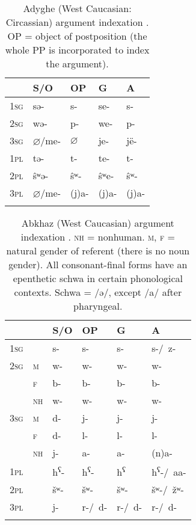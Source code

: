 \documentclass[output=paper,hidelinks]{langscibook}
\begin{document}
\begin{table}[p]
\caption{Adyghe (West Caucasian: Circassian) argument indexation \citep{Arkadev2009}.  OP = object of postposition (the whole PP is incorporated to index the argument).\label{tab5}}
\begin{tabularx}{\textwidth}{>{\scshape}XXXXl}
\lsptoprule
 & S/O & OP & G & A \\
 \midrule
1sg & sə- & s- & se- & s- \\
2sg & wə- & p- & we- & p- \\
3sg & $\varnothing$/me- & $\varnothing$ & je- & jë- \\
\midrule
1pl & tə- & t- & te- & t- \\
2pl & ŝʷə- & ŝʷ- & ŝʷe- & ŝʷ- \\
3pl & $\varnothing$/me- & (j)a- & (j)a- & (j)a- \\
\lspbottomrule
\end{tabularx}
\end{table}

\begin{table}[p]
\caption{Abkhaz (West Caucasian) argument indexation \citep{Chirikba2003}.  \textsc{nh} = nonhuman.  \textsc{m}, \textsc{f} = natural gender of referent (there is no noun gender).  All consonant-final forms have an epenthetic schwa in certain phonological contexts. Schwa = /ə/, except /a/ after pharyngeal.\label{tab6}}
\begin{tabularx}{\textwidth}{>{\scshape}X>{\scshape}XXXXl}
\lsptoprule
 &  		& S/O & OP & G & A \\
 \midrule
1sg  &  	& s- & s-  & s- & s-/~z- \\
2sg	 & m	& w- & w- & w- & w- \\
	 & f 	& b- & b- & b- & b- \\
	 & nh	& w- & w- & w- & w- \\
3sg	 & m 	& d- & j- & j- & j- \\
	 & f 	& d- & l- & l- & l- \\
	 & nh 	& j- & a- & a- & (n)a- \\
1pl	 &		& h\textsuperscript{ʕ}-	& h\textsuperscript{ʕ}- & h\textsuperscript{ʕ} & h\textsuperscript{ʕ}-/~aa-  \\
2pl	 &		& šʷ-	& šʷ- & šʷ- & šʷ-/~žʷ- \\
3pl	 &		& j- & r-/~d- 	  & r-/~d-	 & r-/~d- \\
\lspbottomrule
\end{tabularx}
\end{table}
\end{document}
